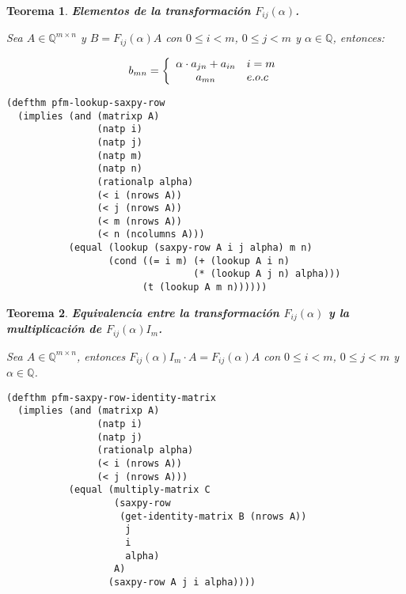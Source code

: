 \documentclass[a4paper,10pt]{article}
\newcommand{\Q}[1]{#1 \in \mathbb{Q}}
\newcommand{\M}[3]{#1 \in \mathbb{Q}^{#2 \times #3}}
\newtheorem{teor}{{Teorema}}
\begin{document}
\par \vspace{16pt}

\begin{teor} \textbf{Elementos de la transformación $F_{ij}(\alpha)$.}\vspace{8pt}\par
Sea $\M{A}{m}{n}$ y $B = F_{ij}(\alpha)A$ con $0 \leq i < m$, $0 \leq j < m$ y $\Q{\alpha}$, entonces:

\begin{equation*} 
b_{mn} = \left\{\begin{array}{c l} \alpha \cdot a_{jn} + a_{in} & i = m\\ 
                                   a_{mn} & e.o.c\end{array}\right.
\end{equation*}

\end{teor}

\begin{lstlisting}[language=clips]
(defthm pfm-lookup-saxpy-row
  (implies (and (matrixp A)
                (natp i)
                (natp j)
                (natp m)
                (natp n)
                (rationalp alpha)
                (< i (nrows A))
                (< j (nrows A))
                (< m (nrows A))
                (< n (ncolumns A)))
           (equal (lookup (saxpy-row A i j alpha) m n)
                  (cond ((= i m) (+ (lookup A i n) 
                                 (* (lookup A j n) alpha)))
                        (t (lookup A m n))))))
\end{lstlisting}

\par \vspace{16pt}

\begin{teor} \textbf{Equivalencia entre la transformación $F_{ij}(\alpha)$ y la multiplicación de $F_{ij}(\alpha)I_m$.}\vspace{8pt}\par
Sea $\M{A}{m}{n}$, entonces $F_{ij}(\alpha)I_m \cdot A = F_{ij}(\alpha)A$ con $0 \leq i < m$, $0 \leq j < m$ y $\Q{\alpha}$.
\end{teor}

\begin{lstlisting}[language=clips]
(defthm pfm-saxpy-row-identity-matrix
  (implies (and (matrixp A)
                (natp i)
                (natp j)
                (rationalp alpha)
                (< i (nrows A))
                (< j (nrows A)))
           (equal (multiply-matrix C
                   (saxpy-row 
                    (get-identity-matrix B (nrows A)) 
                     j
                     i
                     alpha) 
                   A)
                  (saxpy-row A j i alpha))))
\end{lstlisting}
\end{document}
